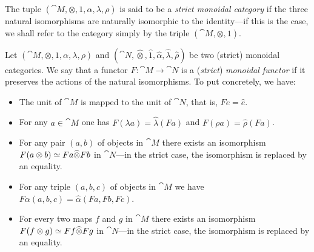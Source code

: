 \documentclass[../../deep-dive]{subfiles}
\begin{document}
The tuple \((\cat M, \otimes, 1, \alpha, \lambda, \rho)\) is said to be a
\emph{strict monoidal category} if the three natural isomorphisms are naturally
isomorphic to the identity---if this is the case, we shall refer to the category
simply by the triple \((\cat M, \otimes, 1)\).

\begin{definition}
    \label{def:monoidal-functor}
    Let \((\cat M, \otimes, 1, \alpha, \lambda, \rho)\) and \((\cat N,
    \widehat\otimes, \widehat 1, \widehat \alpha, \widehat \lambda, \widehat \rho)\)
    be two (strict) monoidal categories. We say that a functor \(F: \cat M \to \cat
    N\) is a (\emph{strict}) \emph{monoidal functor} if it preserves the actions of
    the natural isomorphisms. To put concretely, we have:
    \begin{itemize}\setlength\itemsep{0em}
        \item The unit of \(\cat M\) is mapped to the unit of \(\cat N\), that is,
              \(F e = \widehat e\).

        \item For any \(a \in \cat M\) one has
              \(F (\lambda a) = \widehat \lambda (F a)\) and
              \(F (\rho a) = \widehat \rho(F a)\).

        \item For any pair \((a, b)\) of objects in \(\cat M\) there exists an
              isomorphism \(F(a \otimes b) \simeq F a \widehat \otimes F b\) in \(\cat
              N\)---in the strict case, the isomorphism is replaced by an equality.

        \item For any triple \((a, b, c)\) of objects in \(\cat M\) we have
              \(F \alpha(a, b, c) = \widehat \alpha (F a, F b, F c)\).

        \item For every two maps \(f\) and \(g\) in \(\cat M\) there exists an
              isomorphism \(F(f \otimes g) \simeq F f \widehat \otimes F g\) in
              \(\cat N\)---in the strict case, the isomorphism is replaced by an equality.
    \end{itemize}
\end{definition}
\end{document}

